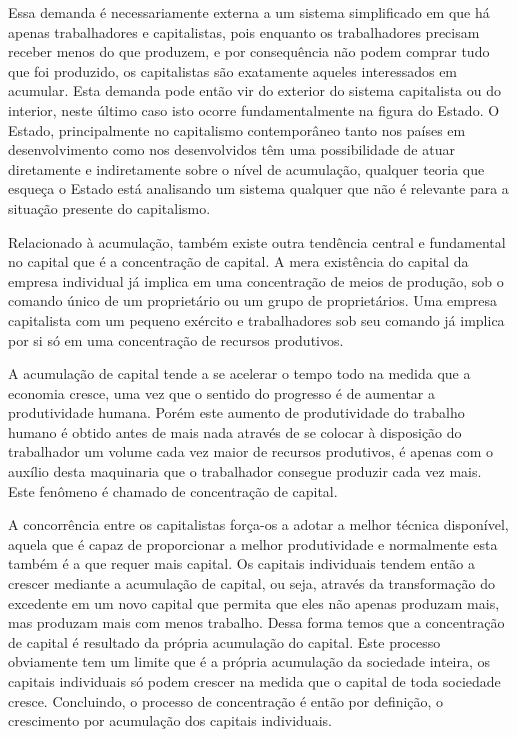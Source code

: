 Essa demanda é necessariamente externa a um sistema simplificado em que há apenas trabalhadores e capitalistas, pois enquanto os trabalhadores precisam receber menos do que produzem, e por consequência não podem comprar tudo que foi produzido, os capitalistas são exatamente aqueles interessados em acumular. Esta demanda pode então vir do exterior do sistema capitalista ou do interior, neste último caso isto ocorre fundamentalmente na figura do Estado. O Estado, principalmente no capitalismo contemporâneo tanto nos países em desenvolvimento como nos desenvolvidos têm uma possibilidade de atuar diretamente e indiretamente sobre o nível de acumulação, qualquer teoria que esqueça o Estado está analisando um sistema qualquer que não é relevante para a situação presente do capitalismo.

Relacionado à acumulação, também existe outra tendência central e fundamental no capital que é a concentração de capital. A mera existência do capital da empresa individual já implica em uma concentração de meios de produção, sob o comando único de um proprietário ou um grupo de proprietários. Uma empresa capitalista com um pequeno exército e trabalhadores sob seu comando já implica por si só em uma concentração de recursos produtivos.

A acumulação de capital tende a se acelerar o tempo todo na medida que a economia cresce, uma vez que o sentido do progresso é de aumentar a produtividade humana. Porém este aumento de produtividade do trabalho humano é obtido antes de mais nada através de se colocar à disposição do trabalhador um volume cada vez maior de recursos produtivos, é apenas com o auxílio desta maquinaria que o trabalhador consegue produzir cada vez mais. Este fenômeno é chamado de concentração de capital.

A concorrência entre os capitalistas força-os a adotar a melhor técnica disponível,  aquela que é capaz de proporcionar a melhor produtividade e normalmente esta também é a que requer mais capital. Os capitais  individuais tendem então a crescer mediante a acumulação de capital,  ou seja, através da transformação do excedente em um novo capital que permita que eles não apenas produzam mais, mas produzam mais com menos trabalho. Dessa forma temos que a concentração de capital é  resultado da própria acumulação do capital.  Este processo obviamente tem um limite que é a própria acumulação da sociedade inteira, os capitais individuais só podem crescer na medida que o capital de toda sociedade cresce. Concluindo, o processo de concentração é então por definição, o crescimento por acumulação dos capitais individuais.

